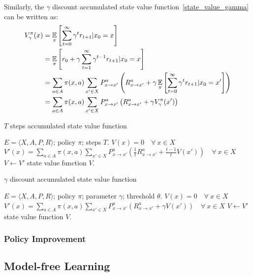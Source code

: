 Similarly, the $\gamma$ discount accumulated state value function~\eqref{state_value_gamma} can be written as:
\begin{align}
    V^\pi_\gamma(x) &= \operatorname*{\mathbb{E}}_\pi\left[\sum_{t=0}^\infty \gamma^t r_{t+1} | x_0 = x\right]\nonumber\\
                    &= \operatorname*{\mathbb{E}}_\pi\left[r_0 + \gamma \sum_{t=1}^\infty \gamma^{t-1}r_{t+1} | x_0=x\right]\nonumber\\
                    &= \sum_{a\in A}\pi(x, a)\sum_{x'\in X}P_{x\rightarrow x'}^a \left(R_{x\rightarrow x'}^a + 
                    \gamma \operatorname*{\mathbb{E}}_\pi\left[\sum_{t=0}^\infty \gamma^t r_{t+1} | x_0 = x'\right]\right)\nonumber\\
                    &= \sum_{a\in A}\pi(x, a)\sum_{x'\in X}P_{x\rightarrow x'}^a \left(R_{x\rightarrow x'}^a +
                    \gamma V^\pi_\gamma(x')\right)
\end{align}

\begin{algorithm}
    \caption{$T$ steps accumulated state value function}
    \begin{algorithmic}[1]
        \Require $E = \langle X, A, P, R\rangle$; policy $\pi$; steps $T$.
        \State $V(x) = 0\quad\forall~x\in X$
            \State $\displaystyle V'(x) = \sum_{a\in A}\pi(x,a)\sum_{x'\in X}P_{x\rightarrow x'}^a 
            \left(\frac{1}{t} R_{x\rightarrow x'}^a + \frac{t-1}{t}V(x')\right)\quad\forall~x\in X$
                \State \algorithmicbreak
            \Else
                \State $V \gets V'$
            \EndIf
        \EndFor
        \Ensure state value function $V$.
    \end{algorithmic}
\end{algorithm}

\begin{algorithm}
    \caption{$\gamma$ discount accumulated state value function}
    \begin{algorithmic}[1]
        \Require $E = \langle X, A, P, R\rangle$; policy $\pi$; parameter $\gamma$; threshold $\theta$.
        \State $V(x) = 0\quad\forall~x\in X$
        \Loop
            \State $\displaystyle V'(x) = \sum_{a\in A}\pi(x,a)\sum_{x'\in X}P_{x\rightarrow x'}^a 
            \left(R_{x\rightarrow x'}^a + \gamma V(x')\right)\quad\forall~x\in X$
                \State \algorithmicbreak
            \Else
                \State $V \gets V'$
            \EndIf
        \EndLoop
        \Ensure state value function $V$.
    \end{algorithmic}
\end{algorithm}



\subsubsection{Policy Improvement}

\subsection{Model-free Learning}